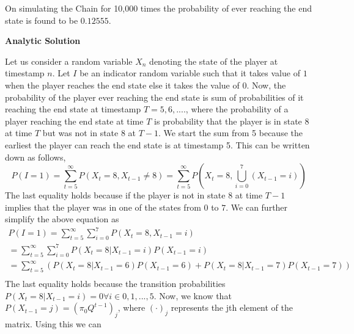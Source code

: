 \documentclass{article}
\begin{document}
\begin{enumerate}
	    \noindent %
        On simulating the Chain for 10,000 times the probability of ever reaching the end state is found to be $0.12555$.

        \textbf{Analytic Solution} \par
	
	    \noindent %
        Let us consider a random variable $X_{n}$ denoting the state of the player at timestamp $n$. Let $I$ be an indicator random 
        variable such that it takes value of $1$ when the player reaches the end state else it takes the value of $0$. Now, the 
        probability of the player ever reaching the end state is sum of probabilities of it reaching the end state at timestamp 
        $T=5, 6, .... $, where the probability of a player reaching the end state at time $T$ is probability that the player is in state
        8 at time $T$ but was not in state 8 at $T-1$. We start the sum from 5 because the earliest the player can reach the end state is 
        at timestamp 5. This can be written down as follows,
        \begin{equation}
        \nonumber
            P(I = 1) = \sum_{t=5}^{\infty} P(X_{t} = 8, X_{t-1} \neq 8) = \sum_{t=5}^{\infty} P\left (X_{t} = 8, \bigcup_{i=0}^{7} (X_{t-1} = i) \right )
        \end{equation}
        The last equality holds because if the player is not in state 8 at time $T-1$ implies that the player was in one of the states 
        from $0$ to $7$. We can 
        further simplify the above equation as
        \begin{equation}
        \nonumber
        \begin{gathered}
            P(I = 1) = \sum_{t=5}^{\infty} \sum_{i=0}^{7} P(X_{t} = 8, X_{t-1} = i)\\
                     = \sum_{t=5}^{\infty} \sum_{i=0}^{7} P(X_{t} = 8 | X_{t-1} = i)P(X_{t-1} = i) \\
                     = \sum_{t=5}^{\infty} (P(X_{t} = 8 | X_{t-1} = 6)P(X_{t-1} = 6) +  P(X_{t} = 8 | X_{t-1} = 7)P(X_{t-1} = 7))\\
        \end{gathered}
        \end{equation}
        The last equality holds because the transition probabilities $P(X_{t} = 8 | X_{t-1} = i) = 0 \forall i \in {0,1,...,5}$. Now, we
        know that $P(X_{t-1} = j) = (\pi_{0}Q^{t-1})_{j}$, where $(\cdot)_{j}$ represents the jth element of the matrix. Using this we can

\end{enumerate}
\end{document}
